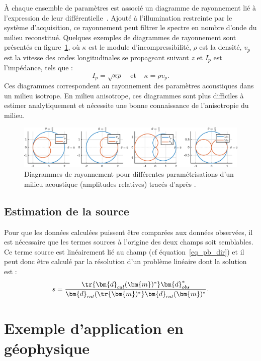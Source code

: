 À chaque ensemble de paramètres est associé un diagramme de rayonnement lié à l'expression de leur différentielle~\citep{forgues}. Ajouté à l'illumination restreinte  par le système d'acquisition, ce rayonnement peut filtrer le spectre en nombre d'onde du milieu reconstitué. Quelques exemples de diagrammes de rayonnement sont présentés en figure~\ref{rayonnement}, où $\kappa$ est le module d'incompressibilité, $\rho$ est la densité, $v_{p}$ est la vitesse des ondes longitudinales se propageant suivant $z$ et $I_{p}$ est l'impédance, tels que : 
\begin{equation*}
	I_{p}=\sqrt{\kappa \rho}~~~~~\text{et}~~~~~\kappa=\rho v_{p}\text{.}
\end{equation*}
Ces diagrammes correspondent au rayonnement des paramètres acoustiques dans un milieu isotrope. En milieu anisotrope, ces diagrammes sont plus difficiles à estimer analytiquement et nécessite une bonne connaissance de l'anisotropie du milieu.

\begin{figure}[!h]
	\hspace{-1cm}\includegraphics[width=1.1\textwidth]{img/rayonnement.png}
	\caption{Diagrammes de rayonnement pour différentes paramétrisations d'un milieu acoustique (amplitudes relatives) tracés d'après \cite{forgues}.\label{rayonnement}}
\end{figure}

\subsection{Estimation de la source}
Pour que les données calculées puissent être comparées aux données observées, il est nécessaire que les termes sources à l'origine des deux champs soit semblables. Ce terme source est linéairement lié au champ (cf équation~\ref{eq_pb_dir}) et il peut donc être calculé par la résolution d'un problème linéaire \citep{pratt_99} dont la solution est : 
$$ s=\frac{\tr{\bm{d}_{cal}(\bm{m})^{*}}\bm{d}_{obs}^{*}}{\bm{d}_{cal}(\tr{\bm{m})^{*}}\bm{d}_{cal}(\bm{m})^{*}}\text{.}$$



\section{Exemple d'application en géophysique}

